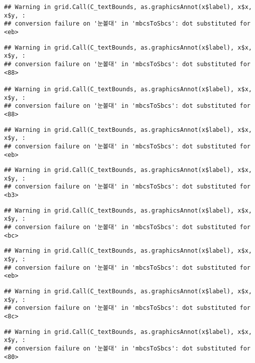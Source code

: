 \documentclass[
]{article}
\begin{document}
\begin{verbatim}
## Warning in grid.Call(C_textBounds, as.graphicsAnnot(x$label), x$x, x$y, :
## conversion failure on '눈볼대' in 'mbcsToSbcs': dot substituted for <eb>
\end{verbatim}

\begin{verbatim}
## Warning in grid.Call(C_textBounds, as.graphicsAnnot(x$label), x$x, x$y, :
## conversion failure on '눈볼대' in 'mbcsToSbcs': dot substituted for <88>

## Warning in grid.Call(C_textBounds, as.graphicsAnnot(x$label), x$x, x$y, :
## conversion failure on '눈볼대' in 'mbcsToSbcs': dot substituted for <88>
\end{verbatim}

\begin{verbatim}
## Warning in grid.Call(C_textBounds, as.graphicsAnnot(x$label), x$x, x$y, :
## conversion failure on '눈볼대' in 'mbcsToSbcs': dot substituted for <eb>
\end{verbatim}

\begin{verbatim}
## Warning in grid.Call(C_textBounds, as.graphicsAnnot(x$label), x$x, x$y, :
## conversion failure on '눈볼대' in 'mbcsToSbcs': dot substituted for <b3>
\end{verbatim}

\begin{verbatim}
## Warning in grid.Call(C_textBounds, as.graphicsAnnot(x$label), x$x, x$y, :
## conversion failure on '눈볼대' in 'mbcsToSbcs': dot substituted for <bc>
\end{verbatim}

\begin{verbatim}
## Warning in grid.Call(C_textBounds, as.graphicsAnnot(x$label), x$x, x$y, :
## conversion failure on '눈볼대' in 'mbcsToSbcs': dot substituted for <eb>
\end{verbatim}

\begin{verbatim}
## Warning in grid.Call(C_textBounds, as.graphicsAnnot(x$label), x$x, x$y, :
## conversion failure on '눈볼대' in 'mbcsToSbcs': dot substituted for <8c>
\end{verbatim}

\begin{verbatim}
## Warning in grid.Call(C_textBounds, as.graphicsAnnot(x$label), x$x, x$y, :
## conversion failure on '눈볼대' in 'mbcsToSbcs': dot substituted for <80>
\end{verbatim}
\end{document}

